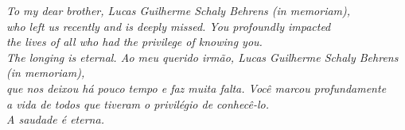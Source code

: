 


\begin{dedicatoria}

    \vspace*{\fill}
    \centering
    \noindent
    \textit{\lang
    {
        To my dear brother, Lucas Guilherme Schaly Behrens (in memoriam), \\
        who left us recently and is deeply missed. You profoundly impacted \\
        the lives of all who had the privilege of knowing you. \\
        The longing is eternal.
    }
    {
        Ao meu querido irmão, Lucas Guilherme Schaly Behrens (in memoriam), \\
        que nos deixou há pouco tempo e faz muita falta. Você marcou profundamente \\
        a vida de todos que tiveram o privilégio de conhecê-lo. \\
        A saudade é eterna.
    }}
    \vspace*{\fill}

\end{dedicatoria}



